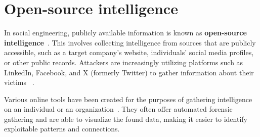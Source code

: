 \section{Open-source intelligence}
\begin{comment}

        - Sites like archive.org and Google archives
        - Observing people in real life
    - Does not include calling the company and asking for information or any other forms of engagement
    - How modern AI augments OSINT gathering is analyzed in the last chapter
        - Exploration of how AI tools and techniques used for the automation and enhancement of OSINT processes
    - Stress the importance of OSINT within SE
    - Ethical considerations when it comes to OSINT
    - Some case studies highlighting the use of OSINT in real-world social engineering incidents?
    - Countermeasures will also be covered later
        - Strategies for companies to mitigate the risks associated with OSINT-based attacks
        - Integration of AI algorithms for analyzing and extracting valuable insights from OSINT data
        - Impact of AI-powered intelligence gathering of SE attacks
        
\end{comment}

In social engineering, publicly available information is known as \textbf{open-source intelligence}~\citep{hadnagy_Social_Engineering_The_Science_2018}. This involves collecting intelligence from sources that are publicly accessible, such as a target company's website, individuals' social media profiles, or other public records. Attackers are increasingly utilizing platforms such as LinkedIn, Facebook, and X (formerly Twitter) to gather information about their victims ~\citep{fakhouri_AI_Driven_Solutions_SE_Attacks_2024}.

Various online tools have been created for the purposes of gathering intelligence on an individual or an organization~\citep{mirsky_Threat_Offensive_AI_Organizations_2023}. They often offer automated forensic gathering and are able to visualize the found data, making it easier to identify exploitable patterns and connections.






















